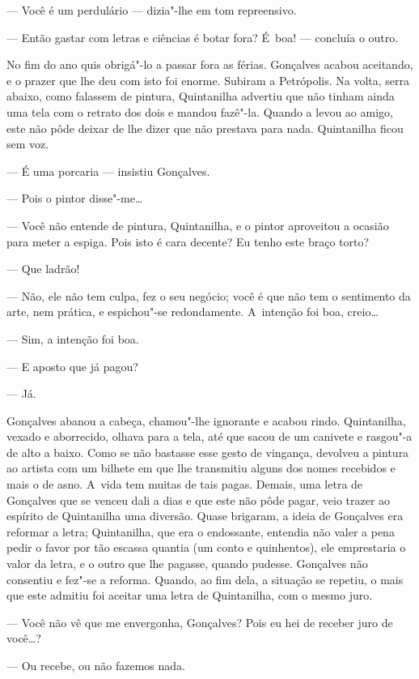 \begin{linenumbers}
--- Você é um perdulário --- dizia"-lhe em tom repreensivo.

--- Então gastar com letras e ciências é botar fora? É~boa! --- concluía o
outro.

No fim do ano quis obrigá"-lo a passar fora as férias. Gonçalves acabou
aceitando, e o prazer que lhe deu com isto foi enorme. Subiram a
Petrópolis. Na volta, serra abaixo, como falassem de pintura,
Quintanilha advertiu que não tinham ainda uma tela com o retrato dos
dois e mandou fazê"-la. Quando a levou ao amigo, este não pôde deixar de
lhe dizer que não prestava para nada. Quintanilha ficou sem voz.

--- É uma porcaria --- insistiu Gonçalves.

--- Pois o pintor disse"-me\ldots{}

--- Você não entende de pintura, Quintanilha, e o pintor aproveitou a
ocasião para meter a espiga. Pois isto é cara decente? Eu tenho este
braço torto?

--- Que ladrão!

--- Não, ele não tem culpa, fez o seu negócio; você é que não tem o
sentimento da arte, nem prática, e espichou"-se redondamente. A~intenção
foi boa, creio\ldots{}

--- Sim, a intenção foi boa.

--- E aposto que já pagou?

--- Já.

Gonçalves abanou a cabeça, chamou"-lhe ignorante e acabou rindo.
Quintanilha, vexado e aborrecido, olhava para a tela, até que sacou de
um canivete e rasgou"-a de alto a baixo. Como se não bastasse esse gesto
de vingança, devolveu a pintura ao artista com um bilhete em que lhe
transmitiu alguns dos nomes recebidos e mais o de asno. A~vida tem
muitas de tais pagas. Demais, uma letra de Gonçalves que se venceu dali
a dias e que este não pôde pagar, veio trazer ao espírito de Quintanilha
uma diversão. Quase brigaram, a ideia de Gonçalves era reformar a letra;
Quintanilha, que era o endossante, entendia não valer a pena pedir o
favor por tão escassa quantia (um conto e quinhentos), ele emprestaria o
valor da letra, e o outro que lhe pagasse, quando pudesse. Gonçalves não
consentiu e fez"-se a reforma. Quando, ao fim dela, a situação se
repetiu, o mais que este admitiu foi aceitar uma letra de Quintanilha,
com o mesmo juro.

--- Você não vê que me envergonha, Gonçalves? Pois eu hei de receber juro
de você\ldots{}?

--- Ou recebe, ou não fazemos nada.


\end{linenumbers}
